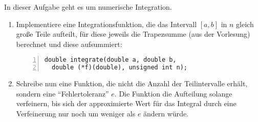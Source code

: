 \documentclass{uebungszettel}
\begin{document}
\begin{aufg}
In dieser Aufgabe geht es um numerische Integration.
\begin{enumerate}
\item Implementiere eine Integrationsfunktion, die das Intervall $[a, b]$ in $n$ gleich große Teile aufteilt, für diese jeweils die Trapezsumme (aus der Vorlesung) berechnet und diese aufsummiert:

\begin{codelisting}
\begin{lstlisting}[numbers=left,numberstyle=\tiny,frame=tlrb]
double integrate(double a, double b, 
  double (*f)(double), unsigned int n); 
\end{lstlisting}
\end{codelisting}

\item Schreibe nun eine Funktion, die nicht die Anzahl der Teilintervalle erhält, sondern eine ``Fehlertoleranz'' $e$. Die Funktion die Aufteilung solange verfeinern, bis sich der approximierte Wert für das Integral durch eine Verfeinerung nur noch um weniger als $e$ ändern würde. 
\end{enumerate}
\end{aufg}
\end{document}
